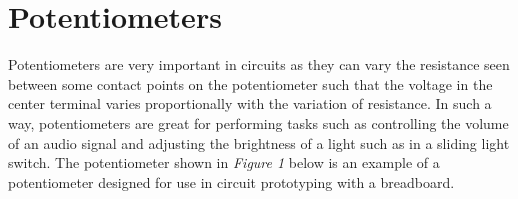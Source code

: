 \documentclass[12pt]{article}
\begin{document}
\MakeLabPrelimTop

\section{Potentiometers}

Potentiometers are very important in circuits as they can vary the resistance seen between some contact points on the potentiometer such that the voltage in the center terminal varies proportionally with the variation of resistance. In such a way, potentiometers are great for performing tasks such as controlling the volume of an audio signal and adjusting the brightness of a light such as in a sliding light switch. The potentiometer shown in \textit{Figure 1} below is an example of a potentiometer designed for use in circuit prototyping with a breadboard.
\end{document}
